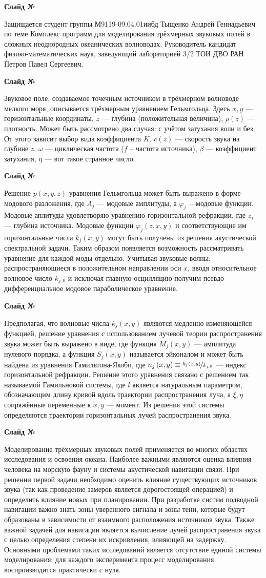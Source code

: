 \documentclass{fefu}
\newcounter{slide}
\newcommand{\slide}{\vskip 1cm\par {\bf Слайд №\theslide}\par\stepcounter{slide}}
\newcommand{\pa}[1]{\left(#1\right)}
\begin{document}
    \slide Защищается студент группы М9119-09.04.01иибд Тыщенко Андрей Геннадьевич по теме Комплекс программ для моделирования трёхмерных звуковых полей в сложных неоднородных океанических волноводах. Руководитель кандидат физико-математических наук, заведующий лабораторией 3/2 ТОИ ДВО РАН Петров Павел Сергеевич.
    \slide Звуковое поле, создаваемое точечным источником в трёхмерном волноводе мелкого моря, описывается трёхмерным уравнением Гельмгольца. Здесь $x,y$ --- горизонтальные координаты, $z$ --- глубина (положительная величина), $\rho\pa{z}$ --- плотность. Может быть рассмотрено два случая: с учётом затухания волн и без. От этого зависит выбор вида коэффициента $K$. $c\pa{z}$ --- скорость звука на глубине $z$. $\omega$ --- циклическая частота ($f$ -- частота источника), $\beta$ --- коэффициент затухания, $\eta$ --- вот такое странное число.
    \slide Решение $p\pa{x,y,z}$ уравнения Гельмгольца может быть выражено в форме модового разложения, где $A_j$ --- модовые амплитуды, а $\varphi_j$ ---модовые функции. Модовые аплитуды удовлетворяю уравнению горизонтальной рефракции, где $z_s$ --- глубина источника. Модовые функции $\varphi_j\pa{z,x,y}$ и соответствующие им горизонтальные числа $k_j(x,y)$ могут быть получены из решения акустической спектральной задачи. Таким образом появляется возможность рассматривать уравнение для каждой моды отдельно. Учитывая звуковые волны, распространяющиеся в положительном направлении оси $x$, вводя относительное волновое число $k_{j,0}$ и исключая главную осцилляцию получим псевдо-дифференциальное модовое параболическое уравнение.
    \slide Предполагая, что волновые числа $k_j\pa{x,y}$ являются медленно изменяющейся функцией, решение уравнения с использованием лучевой теории распространения звука может быть выражено в виде, где функция $M_j\pa{x,y}$ --- амплитуда нулевого порядка, а функция $S_j\pa{x,y}$ называется эйконалом и может быть найдена из уравнения Гамильтона-Якоби, где $n_j\pa{x,y}\equiv \nicefrac{k_j\pa{x,y}}{k_{j,0}}$ --- индекс горизонтальной рефракции. Решение этого уравнения связано с решением так называемой Гамильновой системы, где $l$ является натуральным параметром, обозначающим длину кривой вдоль траектории распространения луча, а $\xi,\eta$ сопряжённые переменные к $x,y$ --- момент. Из решения этой системы определяются траектории горизонтальных лучей распространения звука.
    \slide Моделирование трёхмерных звуковых полей применяется во многих областях исследования и освоения океана. Наиболее важными являются оценка влияния человека на морскую фауну и системы акустической навигации связи. При решении первой задачи необходимо оценить влияние существующих источников звука (так как проведение замеров является дорогостоящей операцией) и определить влияние новых при планировании. При разработке систем подводной навигации важно знать зоны уверенного сигнала и зоны тени, которые будут образованы в зависимости от взаимного расположения источников звука. Также важной задачей для навигации является вычисление лучей распространения звука с целью определения степени их искривления, влияющей на задержку. Основными проблемами таких исследований является отсутствие единой системы моделирования: для каждого эксперимента процесс моделирования воспроизводится практически с нуля.
\end{document}
